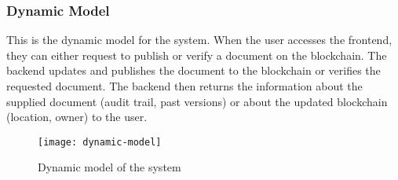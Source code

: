 \newpage
\newpage
\subsubsection{Dynamic Model}
This is the dynamic model for the system. When the user accesses the frontend, they can either request to 
publish or verify a document on the blockchain. The backend updates and publishes the document to 
the blockchain or verifies the requested document. The backend then returns the information about the supplied 
document (audit trail, past versions) or about the updated 
blockchain (location, owner) to the user. 

\begin{figure}[h]
\centering %
\texttt{[image: dynamic-model]} 
\caption{Dynamic model of the system}
\label{fig: dynamic-model} %
\end{figure}
\newpage
